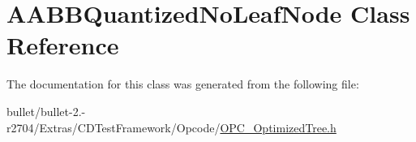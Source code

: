 \hypertarget{class_a_a_b_b_quantized_no_leaf_node}{\section{A\+A\+B\+B\+Quantized\+No\+Leaf\+Node Class Reference}
\label{class_a_a_b_b_quantized_no_leaf_node}
}


The documentation for this class was generated from the following file\+:\begin{DoxyCompactItemize}
\item 
bullet/bullet-\/2.-\/r2704/\+Extras/\+C\+D\+Test\+Framework/\+Opcode/\hyperlink{_o_p_c___optimized_tree_8h}{O\+P\+C\+\_\+\+Optimized\+Tree.\+h}\end{DoxyCompactItemize}
